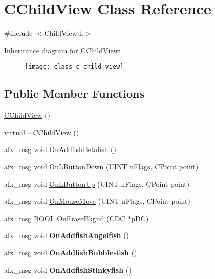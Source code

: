 \hypertarget{class_c_child_view}{}\section{C\+Child\+View Class Reference}
\label{class_c_child_view}


{\ttfamily \#include $<$Child\+View.\+h$>$}

Inheritance diagram for C\+Child\+View\+:\begin{figure}[H]
\begin{center}
\leavevmode
\texttt{[image: class\_c\_child\_view]}
\end{center}
\end{figure}
\subsection*{Public Member Functions}
\begin{DoxyCompactItemize}
\item 
\mbox{\hyperlink{class_c_child_view_aff5af7c162c10755edbe58f260ded6d4}{C\+Child\+View}} ()
\item 
virtual \mbox{\hyperlink{class_c_child_view_a5b033b5e0a130950719a173b86418698}{$\sim$\+C\+Child\+View}} ()
\item 
afx\+\_\+msg void \mbox{\hyperlink{class_c_child_view_ad05faefbdb17d1c73f85de75b01a1ac1}{On\+Addfish\+Betafish}} ()
\item 
afx\+\_\+msg void \mbox{\hyperlink{class_c_child_view_af513a57c45ce8b9dcc09dd934e228534}{On\+L\+Button\+Down}} (U\+I\+NT n\+Flags, C\+Point point)
\item 
afx\+\_\+msg void \mbox{\hyperlink{class_c_child_view_ae81948a77ebf3744bd0f9449af57ee21}{On\+L\+Button\+Up}} (U\+I\+NT n\+Flags, C\+Point point)
\item 
afx\+\_\+msg void \mbox{\hyperlink{class_c_child_view_ad3cb2f8d9fa9a6fb06989513dee5a8bc}{On\+Mouse\+Move}} (U\+I\+NT n\+Flags, C\+Point point)
\item 
afx\+\_\+msg B\+O\+OL \mbox{\hyperlink{class_c_child_view_a6060e6d09d522d345dcee5a01d41c1f0}{On\+Erase\+Bkgnd}} (C\+DC $\ast$p\+DC)
\item 
\mbox{\label{class_c_child_view_a0851773b3881bff0ad4339ff2326cc3a}} 
afx\+\_\+msg void {\bfseries On\+Addfish\+Angelfish} ()
\item 
\mbox{\label{class_c_child_view_a506233f026a1323bb2e127dca3f3160d}} 
afx\+\_\+msg void {\bfseries On\+Addfish\+Bubblesfish} ()
\item 
\mbox{\label{class_c_child_view_a777cf466cd5d4d8a5894e6f4575171f1}} 
afx\+\_\+msg void {\bfseries On\+Addfish\+Stinkyfish} ()
\end{DoxyCompactItemize}

